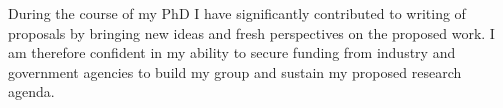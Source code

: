 \documentclass[10pt]{article}
\begin{document}
During the course of my PhD I have significantly contributed to writing of proposals by bringing new ideas and fresh perspectives on the proposed work. I am therefore confident in my ability to secure funding from industry and government agencies to build my group and sustain my proposed research agenda.



\footnotesize


\end{document}
